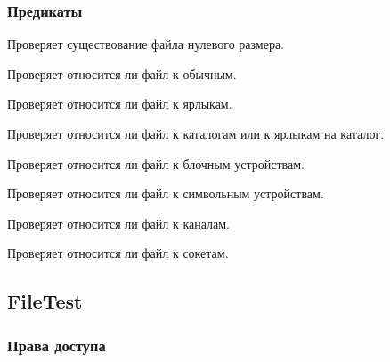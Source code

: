 \subsubsection*{Предикаты}

\begin{methodlist}
  Проверяет существование файла нулевого размера. 

  Проверяет относится ли файл к обычным. 

  Проверяет относится ли файл к ярлыкам. 

  Проверяет относится ли файл к каталогам или к ярлыкам на каталог. 

  Проверяет относится ли файл к блочным устройствам. 

  Проверяет относится ли файл к символьным устройствам. 

  Проверяет относится ли файл к каналам. 

  Проверяет относится ли файл к сокетам.
\end{methodlist}

\subsection{FileTest}

\subsubsection*{Права доступа}

